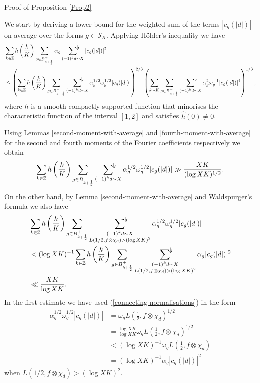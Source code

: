 \documentclass[a4paper,10pt,twoside]{amsart}
\theoremstyle{definition}
\numberwithin{equation}{section}
\newcommand\Z{\mathbb{Z}}
\renewcommand\:{\colon}
\newcommand{\sumflat}{\mathop{{\sum}^{\raisebox{-3pt}{\makebox[0pt][l]{$\flat$}}}}}
\begin{document}
\begin{subsection}{Proof of Proposition \ref{Prop2}}

We start by deriving a lower bound for the weighted sum of the terms $|c_g(|d|)|$ on average over the forms $g\in\mathcal S_K$. Applying H\"older's inequality we have 
\begin{align*}
&\sum_{k\in\Z}h\left(\frac{k}K\right)\sum_{g\in B_{k+\frac12}^+}\alpha_g\sumflat_{(-1)^kd\sim X}|c_g(|d|)|^2\\
&\leq\left(\sum_{k\in\Z}h\left(\frac{k}K\right)\sum_{g\in B_{k+\frac12}^+}\sumflat_{(-1)^kd\sim X}\alpha_g^{1/2}\omega_g^{1/2}|c_g(|d|)|\right)^{2/3}\left(\sum_{k\sim K}\sum_{g\in B_{k+\frac12}^+}\sumflat_{(-1)^kd\sim X}\alpha_g^2\omega_g^{-1}|c_g(|d|)|^4\right)^{1/3},
\end{align*}
where $h$ is a smooth compactly supported function that minorises the characteristic function of the interval $[1,2]$ and satisfies $\widehat h(0)\neq 0$.

Using Lemmas \ref{second-moment-with-average} and \ref{fourth-moment-with-average} for the second and fourth moments of the Fourier coefficients respectively we obtain
\begin{align*}
\sum_{k\in\Z}h\left(\frac{k}K\right)\sum_{g\in B_{k+\frac12}^+}\sumflat_{(-1)^kd\sim X}\alpha_g^{1/2}\omega_g^{1/2}|c_g(|d|)|\gg\frac{XK}{(\log XK)^{1/2}}.
\end{align*}
On the other hand, by Lemma \ref{second-moment-with-average} and Waldspurger's formula we also have 
\begin{align*}
&\sum_{k\in\Z}h\left(\frac{k}K\right)\sum_{g\in B_{k+\frac12}^+}\sumflat_{\substack{(-1)^kd\sim X\\
L(1/2,f\otimes \chi_{d})>(\log XK)^2}}\alpha_g^{1/2}\omega_g^{1/2}|c_g(|d|)|\\
&<(\log XK)^{-1}\sum_{k\in\Z}h\left(\frac{k}K\right)\sum_{g\in B_{k+\frac12}^+}\sumflat_{\substack{(-1)^kd\sim X\\
L(1/2,f\otimes\chi_{d})>(\log XK)^2}}\alpha_g|c_g(|d|)|^2\\
&\ll \frac{XK}{\log XK}.
\end{align*}
In the first estimate we have used (\ref{connecting-normalisations}) in the form
\begin{align*}
\alpha_g^{1/2}\omega_g^{1/2}|c_g(|d|)|&=\omega_gL\left(\frac12,f\otimes\chi_d\right)^{1/2}\\
&=\frac{\log XK}{\log XK}\omega_g L\left(\frac12,f\otimes\chi_d\right)^{1/2}\\
&<(\log XK)^{-1}\omega_g L\left(\frac12,f\otimes\chi_d\right)\\
&=(\log XK)^{-1}\alpha_g|c_g(|d|)|^2
\end{align*}
when $L(1/2,f\otimes\chi_d)>(\log XK)^2$.


\end{subsection}
\end{document}
